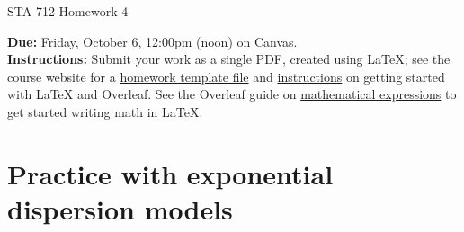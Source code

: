 \documentclass[11pt]{article}
\begin{document}
\begin{center}
\Large
STA 712 Homework 4\\
\normalsize
\vspace{5mm}
\end{center}

\noindent \textbf{Due:} Friday, October 6, 12:00pm (noon) on Canvas.\\ 

\noindent \textbf{Instructions:} Submit your work as a single PDF, created using LaTeX; see the course website for a \href{https://sta712-f23.github.io/homework/hw_template.tex}{homework template file} and \href{https://sta712-f23.github.io/homework/latex_instructions/}{instructions} on getting started with LaTeX and Overleaf. See the Overleaf guide on \href{https://www.overleaf.com/learn/latex/Mathematical_expressions}{mathematical expressions} to get started writing math in LaTeX.

\section*{Practice with exponential dispersion models}
\end{document}
